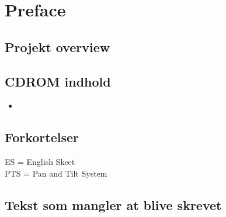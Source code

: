 \section*{Preface}

\subsection*{Projekt overview}


\subsection*{CDROM indhold}
\begin{itemize}
\item 
\end{itemize}



\subsection*{Forkortelser}
ES = English Skeet \\
PTS = Pan and Tilt System



\newpage
\subsection*{Tekst som mangler at blive skrevet}
\listoftodos
